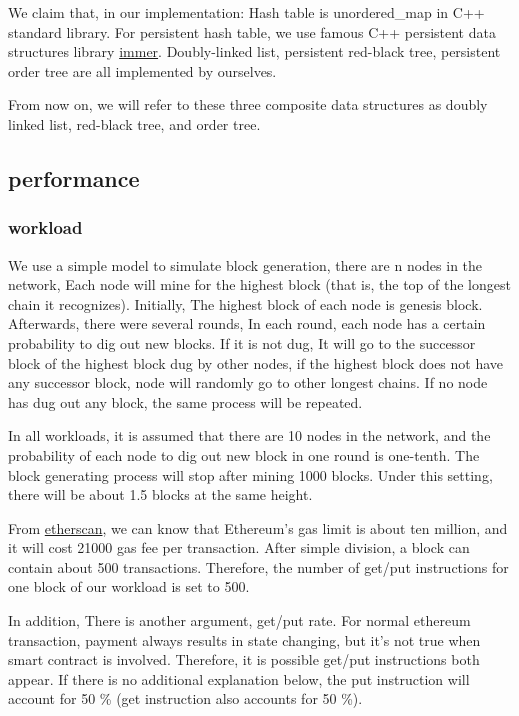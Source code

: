 \documentclass[conference]{IEEEtran}
\begin{document}
We claim that, in our implementation:
Hash table is unordered\_map in C++ standard library.
For persistent hash table, we use famous C++
persistent data structures library \href{https://sinusoid.es/immer/}{immer}.
Doubly-linked list, persistent red-black tree,
persistent order tree are all implemented by ourselves.

From now on, we will refer to these three composite data structures
as doubly linked list, red-black tree, and order tree.

\subsection{performance}

\subsubsection{workload}
We use a simple model to simulate block generation,
there are n nodes in the network,
Each node will mine for the highest block
(that is, the top of the longest chain it recognizes).
Initially, The highest block of each node
is genesis block. Afterwards, there were several rounds,
In each round, each node has a certain probability
to dig out new blocks. If it is not dug,
It will go to the successor block of the
highest block dug by other nodes,
if the highest block does not have any successor block,
node will randomly go to other longest chains.
If no node has dug out any block,
the same process will be repeated.

In all workloads, it is assumed that there
are 10 nodes in the network, and the probability
of each node to dig out new block in one round is one-tenth.
The block generating process will stop after mining 1000 blocks.
Under this setting, there will be about
1.5 blocks at the same height.

From \href{https://etherscan.io/chart/gaslimit}{etherscan}, we can
know that Ethereum's gas limit is about ten million, and
it will cost 21000 gas fee per transaction.
After simple division, a block can contain about 500 transactions.
Therefore, the number of get/put instructions
for one block of our workload is set to 500.

In addition, There is another argument, get/put rate.
For normal ethereum transaction,
payment always results in state changing,
but it's not true when smart contract is involved.
Therefore, it is possible get/put instructions both appear.
If there is no additional explanation below,
the put instruction will account for 50 \% (get instruction also accounts for 50 \%).
\end{document}
